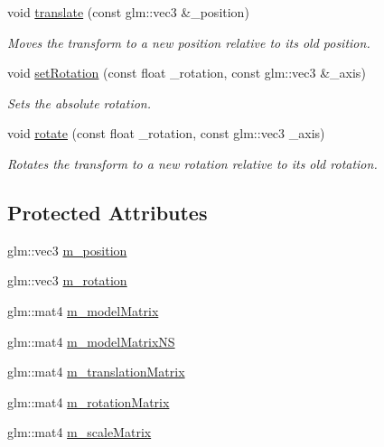 \begin{DoxyCompactItemize}
void \hyperlink{class_cookie_eng_1_1_components_1_1_transform_afe2e00e8126fd92eab8c2e1a5725b2c5}{translate} (const glm\+::vec3 \&\+\_\+position)
\begin{DoxyCompactList}\small\item\em Moves the transform to a new position relative to its old position. \end{DoxyCompactList}\item 
void \hyperlink{class_cookie_eng_1_1_components_1_1_transform_a382a16d437c34d7e345a60d11a9578b2}{set\+Rotation} (const float \+\_\+rotation, const glm\+::vec3 \&\+\_\+axis)
\begin{DoxyCompactList}\small\item\em Sets the absolute rotation. \end{DoxyCompactList}\item 
void \hyperlink{class_cookie_eng_1_1_components_1_1_transform_a061b3b2b5d33c1dda2955e9b2e01d736}{rotate} (const float \+\_\+rotation, const glm\+::vec3 \+\_\+axis)
\begin{DoxyCompactList}\small\item\em Rotates the transform to a new rotation relative to its old rotation. \end{DoxyCompactList}\end{DoxyCompactItemize}
\subsection*{Protected Attributes}
\begin{DoxyCompactItemize}
\item 
glm\+::vec3 \hyperlink{class_cookie_eng_1_1_components_1_1_transform_a6e99757f68b1de46b9caeaacdf6e88ae}{m\+\_\+position}
\item 
glm\+::vec3 \hyperlink{class_cookie_eng_1_1_components_1_1_transform_ab47df9535ea8c9b95ebd86b16381b86b}{m\+\_\+rotation}
\item 
glm\+::mat4 \hyperlink{class_cookie_eng_1_1_components_1_1_transform_ab4c66323537c12117739471665c6ddf9}{m\+\_\+model\+Matrix}
\item 
glm\+::mat4 \hyperlink{class_cookie_eng_1_1_components_1_1_transform_a247892c3be676ab7ec613600435cead8}{m\+\_\+model\+Matrix\+NS}
\item 
glm\+::mat4 \hyperlink{class_cookie_eng_1_1_components_1_1_transform_a8ab2d1886012bb7942ef4e4aafbd0321}{m\+\_\+translation\+Matrix}
\item 
glm\+::mat4 \hyperlink{class_cookie_eng_1_1_components_1_1_transform_aea4ccabe5423b8d31df96c6b9bd5553e}{m\+\_\+rotation\+Matrix}
\item 
glm\+::mat4 \hyperlink{class_cookie_eng_1_1_components_1_1_transform_aa41354d093d9821fb9a790517d97732f}{m\+\_\+scale\+Matrix}
\end{DoxyCompactItemize}
